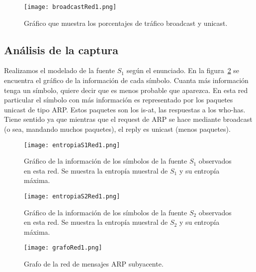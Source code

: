 
\begin{figure}[H]
\centering
\texttt{[image: broadcastRed1.png]}
\caption{Gráfico que muestra los porcentajes de tráfico broadcast y unicast.}
\label{broadcast1}
\end{figure}

\subsection{Análisis de la captura}

Realizamos el modelado de la fuente $S_1$ según el enunciado. En la figura~\ref{entropias1_1} se encuentra el gráfico de la información de cada símbolo. Cuanta más información tenga un símbolo, quiere decir que es menos probable que aparezca. En esta red particular el símbolo con más información es representado por los paquetes unicast de tipo ARP. Estos paquetes son los is-at, las respuestas a los who-has. Tiene sentido ya que mientras que el request de ARP se hace mediante broadcast (o sea, mandando muchos paquetes), el reply es unicast (menos paquetes).

\begin{figure}[H]
\centering
\texttt{[image: entropiaS1Red1.png]}
\caption{Gráfico de la información de los símbolos de la fuente $S_1$ observados en esta red. Se muestra la entropía muestral de $S_1$ y su entropía máxima.}
\label{entropias1_1}
\end{figure}

\begin{figure}[H]
\centering
\texttt{[image: entropiaS2Red1.png]}
\caption{Gráfico de la información de los símbolos de la fuente $S_2$ observados en esta red. Se muestra la entropía muestral de $S_2$ y su entropía máxima.}
\label{entropias2_1}
\end{figure}

\begin{figure}[H]
\centering
\texttt{[image: grafoRed1.png]}
\caption{Grafo de la red de mensajes ARP subyacente.}
\label{grafo1}
\end{figure}
